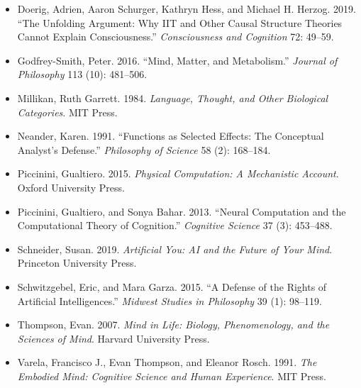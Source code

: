 \documentclass[11pt]{article}
\begin{document}
\begin{itemize}[leftmargin=2em, itemsep=2pt, label={}]
\item Doerig, Adrien, Aaron Schurger, Kathryn Hess, and Michael H. Herzog. 2019. ``The Unfolding Argument: Why IIT and Other Causal Structure Theories Cannot Explain Consciousness.'' \emph{Consciousness and Cognition} 72: 49--59.
\item Godfrey-Smith, Peter. 2016. ``Mind, Matter, and Metabolism.'' \emph{Journal of Philosophy} 113 (10): 481--506.
\item Millikan, Ruth Garrett. 1984. \emph{Language, Thought, and Other Biological Categories}. MIT Press.
\item Neander, Karen. 1991. ``Functions as Selected Effects: The Conceptual Analyst's Defense.'' \emph{Philosophy of Science} 58 (2): 168--184.
\item Piccinini, Gualtiero. 2015. \emph{Physical Computation: A Mechanistic Account}. Oxford University Press.
\item Piccinini, Gualtiero, and Sonya Bahar. 2013. ``Neural Computation and the Computational Theory of Cognition.'' \emph{Cognitive Science} 37 (3): 453--488.
\item Schneider, Susan. 2019. \emph{Artificial You: AI and the Future of Your Mind}. Princeton University Press.
\item Schwitzgebel, Eric, and Mara Garza. 2015. ``A Defense of the Rights of Artificial Intelligences.'' \emph{Midwest Studies in Philosophy} 39 (1): 98--119.
\item Thompson, Evan. 2007. \emph{Mind in Life: Biology, Phenomenology, and the Sciences of Mind}. Harvard University Press.
\item Varela, Francisco J., Evan Thompson, and Eleanor Rosch. 1991. \emph{The Embodied Mind: Cognitive Science and Human Experience}. MIT Press.
\end{itemize}
\end{document}
